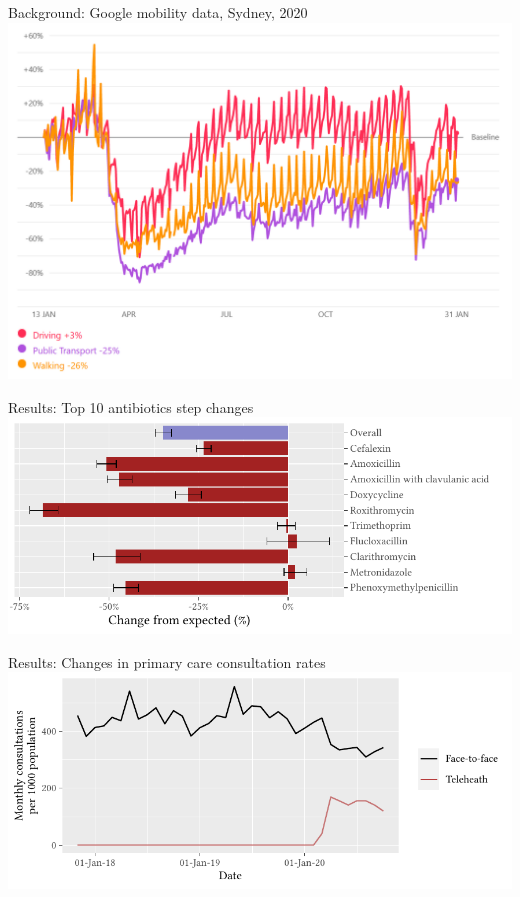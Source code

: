 \documentclass[aspectratio=169,12pt]{beamer} %
\begin{document}
\begin{frame}{Background: Google mobility data, Sydney, 2020}
\centering
\includegraphics[height=0.8\textheight]
        {ref/google-mobility-20210202.PNG}
\end{frame}

\begin{frame}{Results: Top 10 antibiotics step changes}
\centering
\includegraphics{ref/latex-j01arimatab-1.pdf}
\end{frame}

\begin{frame}{Results: Changes in primary care consultation rates}
\centering
\includegraphics{ref/latex-suppmbs-1.pdf}
\nocite{gillies_2022}
\end{frame}
\end{document}
